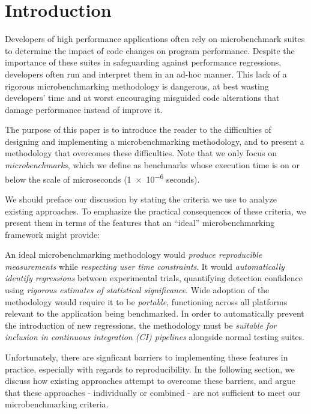 \documentclass[conference]{IEEEtran}
\begin{document}
\IEEEpeerreviewmaketitle


\label{sec:intro}
\section{Introduction}

Developers of high performance applications often rely on microbenchmark suites to determine
the impact of code changes on program performance. Despite the importance of these suites in
safeguarding against performance regressions, developers often run and interpret them in an
ad-hoc manner. This lack of a rigorous microbenchmarking methodology is dangerous, at best
wasting developers' time and at worst encouraging misguided code alterations that damage
performance instead of improve it.

The purpose of this paper is to introduce the reader to the difficulties of designing and
implementing a microbenchmarking methodology, and to present a methodology that overcomes
these difficulties. Note that we only focus on \textit{microbenchmarks}, which we define as
benchmarks whose execution time is on or below the scale of microseconds (\num{1e-6}
seconds).

We should preface our discussion by stating the criteria we use to analyze existing
approaches. To emphasize the practical consequences of these criteria, we present them in
terms of the features that an ``ideal'' microbenchmarking framework might provide:

An ideal microbenchmarking methodology would \textit{produce reproducible measurements}
while \textit{respecting user time constraints}. It would \textit{automatically identify
regressions} between experimental trials, quantifying detection confidence using
\textit{rigorous estimates of statistical significance}. Wide adoption of the methodology
would require it to be \textit{portable}, functioning across all platforms relevant to the
application being benchmarked. In order to automatically prevent the introduction of new
regressions, the methodology must be \textit{suitable for inclusion in continuous
integration (CI) pipelines} alongside normal testing suites.

Unfortunately, there are signficant barriers to implementing these features in practice,
especially with regards to reproducibility. In the following section, we discuss how
existing approaches attempt to overcome these barriers, and argue that these approaches -
individually or combined - are not sufficient to meet our microbenchmarking criteria.
\end{document}
